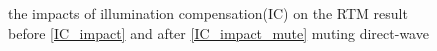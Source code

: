 \documentclass[a4paper]{article}
\begin{document}
	\begin{figure}[ht]

		\centering
		\caption{the impacts of illumination compensation(IC) on the RTM result before \ref{IC_impact} and after \ref{IC_impact_mute} muting direct-wave }
		\label{RTM_c}
	\end{figure}

\clearpage



	



\end{document}
